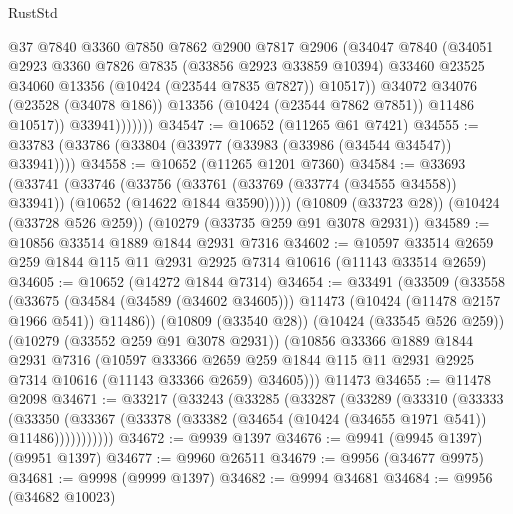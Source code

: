 \begin{lexlean}{RustStd}
\begin{coremodule}
                      @37
                      @7840
                      @3360
                      @7850
                      @7862
                      @2900
                      @7817
                      @2906
                      (@34047
                        @7840
                        (@34051
                          @2923
                          @3360
                          @7826
                          @7835
                          (@33856 @2923 @33859 @10394)
                          @33460
                          @23525
                          @34060
                          @13356
                          (@10424 (@23544 @7835 @7827))
                          @10517))
                      @34072
                      @34076
                      (@23528 (@34078 @186))
                      @13356
                      (@10424 (@23544 @7862 @7851))
                      @11486
                      @10517))
                  @33941)))))))
@34547 := @10652 (@11265 @61 @7421)
@34555 := @33783 (@33786 (@33804 (@33977 (@33983 (@33986 (@34544 @34547)) @33941))))
@34558 := @10652 (@11265 @1201 @7360)
@34584 := @33693
    (@33741
      (@33746
        (@33756 (@33761 (@33769 (@33774 (@34555 @34558)) @33941)) (@10652 (@14622 @1844 @3590)))))
    (@10809 (@33723 @28))
    (@10424 (@33728 @526 @259))
    (@10279 (@33735 @259 @91 @3078 @2931))
@34589 := @10856 @33514 @1889 @1844 @2931 @7316
@34602 := @10597 @33514 @2659 @259 @1844 @115 @11 @2931 @2925 @7314 @10616 (@11143 @33514 @2659)
@34605 := @10652 (@14272 @1844 @7314)
@34654 := @33491
    (@33509
      (@33558
        (@33675 (@34584 (@34589 (@34602 @34605))) @11473 (@10424 (@11478 @2157 @1966 @541)) @11486))
      (@10809 (@33540 @28))
      (@10424 (@33545 @526 @259))
      (@10279 (@33552 @259 @91 @3078 @2931))
      (@10856
        @33366
        @1889
        @1844
        @2931
        @7316
        (@10597
          @33366
          @2659
          @259
          @1844
          @115
          @11
          @2931
          @2925
          @7314
          @10616
          (@11143 @33366 @2659)
          @34605)))
    @11473
@34655 := @11478 @2098
@34671 := @33217
    (@33243
      (@33285
        (@33287
          (@33289
            (@33310
              (@33333
                (@33350
                  (@33367 (@33378 (@33382 (@34654 (@10424 (@34655 @1971 @541)) @11486)))))))))))
@34672 := @9939 @1397
@34676 := @9941 (@9945 @1397) (@9951 @1397)
@34677 := @9960 @26511
@34679 := @9956 (@34677 @9975)
@34681 := @9998 (@9999 @1397)
@34682 := @9994 @34681
@34684 := @9956 (@34682 @10023)

\end{coremodule}
\end{lexlean}
